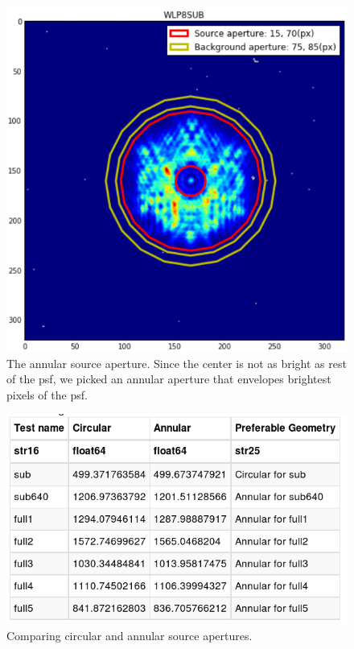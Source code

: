 \documentclass{aastex6}
\begin{document}
        \begin{figure}[H]
            \includegraphics[scale=0.4]{Annular_source}
            \caption{The annular source aperture. Since the center is not as bright as rest of the psf, we picked an annular aperture that envelopes brightest pixels of the psf.}
        \end{figure}
        
        
        \begin{figure}[H]
            \includegraphics[scale=0.4]{src_ap}
            \caption{Comparing circular and annular source apertures.}
        \end{figure}
        
\end{document}
